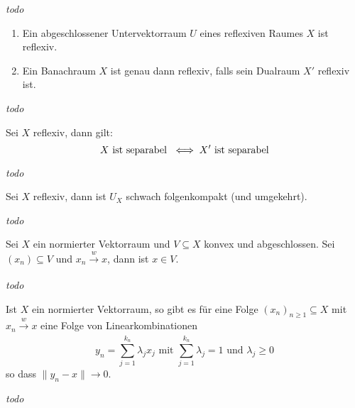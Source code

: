 \begin{beweis}
	\textit{todo} %
\end{beweis}


\begin{prop}
	\begin{enumerate}
		\item Ein abgeschlossener Untervektorraum $U$ eines reflexiven Raumes $X$ ist reflexiv.
		\item Ein Banachraum $X$ ist genau dann reflexiv, falls sein Dualraum $X'$ reflexiv ist.
	\end{enumerate}
\end{prop}

\begin{beweis}
	\textit{todo} %
\end{beweis}


\begin{lemma}
	Sei $X$ reflexiv, dann gilt:
	\[ X \text{ ist separabel } \iff X' \text{ ist separabel} \]
\end{lemma}

\begin{beweis}
	\textit{todo} %
\end{beweis}


\begin{satz}
	Sei $X$ reflexiv, dann ist $U_{X}$ schwach folgenkompakt (und umgekehrt).
\end{satz}

\begin{beweis}
	\textit{todo} %
\end{beweis}


\begin{satz}
	Sei $X$ ein normierter Vektorraum und $V \subseteq X$ konvex und abgeschlossen. Sei $(x_{n}) \subseteq V$ und $x_{n} \xrightarrow[]{w} x$, dann ist $x \in V$.
\end{satz}

\begin{beweis}
	\textit{todo} %
\end{beweis}


\begin{kor} 
	Ist $X$ ein normierter Vektorraum, so gibt es für eine Folge $(x_{n})_{n \geq 1} \subseteq X$ mit $x_{n} \xrightarrow[]{w} x$ eine Folge von Linearkombinationen
	\[ y_{n} = \sum_{j = 1}^{k_{n}} \lambda_{j} x_{j} \text{ mit } \sum_{j = 1}^{k_{n}} \lambda_{j} = 1 \text{ und } \lambda_{j} \geq 0 \]
	so dass $\| y_{n} - x \| \rightarrow 0$.
\end{kor}

\begin{beweis}
	\textit{todo} %
\end{beweis}


\newpage